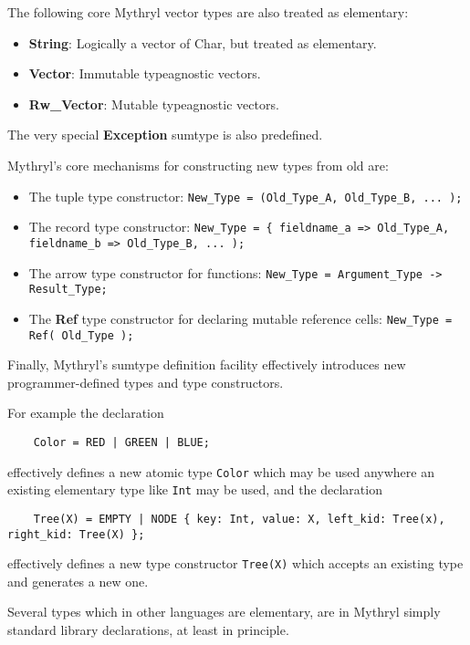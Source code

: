 The following core Mythryl vector types are also treated as elementary:
\begin{itemize}
\item {\bf String}:  Logically a vector of Char, but treated as elementary.
\item {\bf Vector}:  Immutable typeagnostic vectors.
\item {\bf Rw\_Vector}:  Mutable typeagnostic vectors.
\end{itemize}

The very special {\bf Exception} sumtype is also predefined.

Mythryl's core mechanisms for constructing new types from old are:

\begin{itemize}
\item The tuple type constructor:  {\tt \verb|New_Type = (Old_Type_A, Old_Type_B, ... );| }
\item The record type constructor:  {\tt \verb|New_Type = { fieldname_a => Old_Type_A, fieldname_b => Old_Type_B, ... );| }
\item The arrow type constructor for functions:  {\tt \verb|New_Type = Argument_Type -> Result_Type;| }
\item The {\bf Ref} type constructor for declaring mutable reference cells:  {\tt \verb|New_Type = Ref( Old_Type );| }
\end{itemize}

Finally, Mythryl's sumtype definition facility effectively 
introduces new programmer-defined types and type constructors.

For example the declaration
\begin{verbatim}
    Color = RED | GREEN | BLUE;
\end{verbatim}

effectively defines a new atomic type {\tt Color} which may be used anywhere an 
existing elementary type like {\tt Int} may be used, and the declaration

\begin{verbatim}
    Tree(X) = EMPTY | NODE { key: Int, value: X, left_kid: Tree(x), right_kid: Tree(X) };
\end{verbatim}

effectively defines a new type constructor {\tt Tree(X)} which accepts an 
existing type and generates a new one.

Several types which in other languages are elementary, are in Mythryl 
simply standard library declarations, at least in principle.

